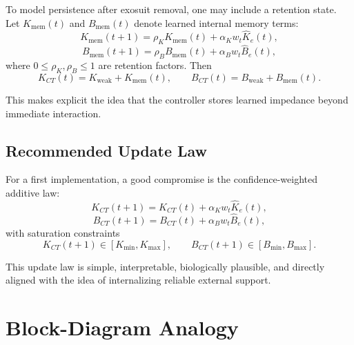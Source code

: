 \documentclass[11pt]{article}
\begin{document}
To model persistence after exosuit removal, one may include a retention state. Let \(K_{\mathrm{mem}}(t)\) and \(B_{\mathrm{mem}}(t)\) denote learned internal memory terms:
\begin{equation}
K_{\mathrm{mem}}(t+1) = \rho_K K_{\mathrm{mem}}(t) + \alpha_K w_t \hat{K}_e(t),
\end{equation}
\begin{equation}
B_{\mathrm{mem}}(t+1) = \rho_B B_{\mathrm{mem}}(t) + \alpha_B w_t \hat{B}_e(t),
\end{equation}
where \(0 \le \rho_K,\rho_B \le 1\) are retention factors. Then
\begin{equation}
K_{CT}(t) = K_{\mathrm{weak}} + K_{\mathrm{mem}}(t),
\qquad
B_{CT}(t) = B_{\mathrm{weak}} + B_{\mathrm{mem}}(t).
\end{equation}

This makes explicit the idea that the controller stores learned impedance beyond immediate interaction.

\subsection{Recommended Update Law}

For a first implementation, a good compromise is the confidence-weighted additive law:
\begin{equation}
K_{CT}(t+1) = K_{CT}(t) + \alpha_K w_t \hat{K}_e(t),
\end{equation}
\begin{equation}
B_{CT}(t+1) = B_{CT}(t) + \alpha_B w_t \hat{B}_e(t),
\end{equation}
with saturation constraints
\begin{equation}
K_{CT}(t+1) \in [K_{\min},K_{\max}], \qquad
B_{CT}(t+1) \in [B_{\min},B_{\max}].
\end{equation}

This update law is simple, interpretable, biologically plausible, and directly aligned with the idea of internalizing reliable external support.

\section{Block-Diagram Analogy}

\end{document}
